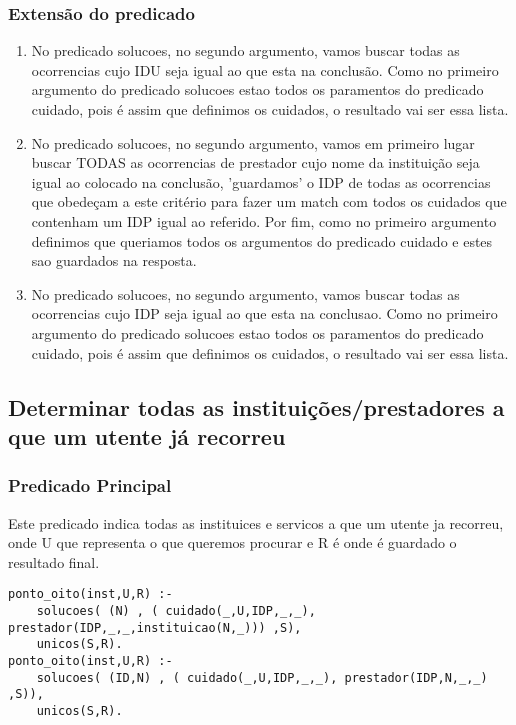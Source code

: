\documentclass[a4paper]{report} %
\begin{document}
\subsubsection{Extensão do predicado}
\begin{enumerate}
\item No predicado solucoes, no segundo argumento, vamos buscar todas as ocorrencias cujo IDU seja igual ao que esta na conclusão. Como no primeiro argumento do predicado solucoes estao todos os paramentos do predicado cuidado, pois é assim que definimos os cuidados, o resultado vai ser essa lista.
\item No predicado solucoes, no segundo argumento, vamos em primeiro lugar buscar TODAS as ocorrencias de prestador cujo nome da instituição seja igual ao colocado na conclusão, 'guardamos' o IDP de todas as ocorrencias que obedeçam a este critério para fazer um match com todos os cuidados que contenham um IDP igual ao referido. Por fim, como no primeiro argumento definimos que queriamos todos os argumentos do predicado cuidado e estes sao guardados na resposta.
\item No predicado solucoes, no segundo argumento, vamos buscar todas as ocorrencias cujo IDP seja igual ao que esta na conclusao. Como no primeiro argumento do predicado solucoes estao todos os paramentos do predicado cuidado, pois é assim que definimos os cuidados, o resultado vai ser essa lista.
\end{enumerate}

\subsection{Determinar todas as instituições/prestadores a que um utente já recorreu}

\subsubsection{Predicado Principal}
Este predicado indica todas as instituices e servicos a que um utente ja recorreu, onde U que representa o que queremos procurar e R é onde é guardado o resultado final.

\begin{verbatim}
ponto_oito(inst,U,R) :- 
    solucoes( (N) , ( cuidado(_,U,IDP,_,_), prestador(IDP,_,_,instituicao(N,_))) ,S),
    unicos(S,R).
ponto_oito(inst,U,R) :- 
    solucoes( (ID,N) , ( cuidado(_,U,IDP,_,_), prestador(IDP,N,_,_) ,S)), 
    unicos(S,R).
\end{verbatim}
\end{document}
